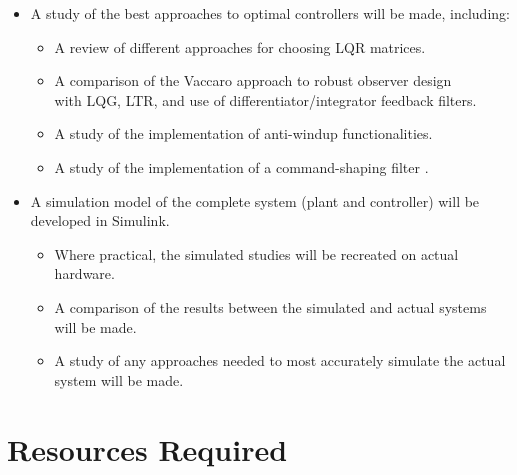 \documentclass[crop=false,float=true,class=scrartcl]{standalone}
\begin{document}
\begin{itemize}
\item A study of the best approaches to optimal controllers will be made, including:

  \begin{itemize}
  \item A review of different approaches for choosing LQR matrices.
  \item A comparison of the Vaccaro approach to robust observer design \cite{REF:Conference:2014-Vaccaro} \\
        with LQG, LTR, and use of differentiator/integrator feedback filters.
  \item A study of the implementation of anti-windup functionalities.
  \item A study of the implementation of a command-shaping filter \cite{REF:Interview:2017-01-23-Vaccaro}.
  \end{itemize}

\item A simulation model of the complete system (plant and controller) will be developed in Simulink.

  \begin{itemize}
  \item Where practical, the simulated studies will be recreated on actual hardware.
  \item A comparison of the results between the simulated and actual systems will be made.
  \item A study of any approaches needed to most accurately simulate the actual system will be made.
  \end{itemize}



\end{itemize}




\clearpage




\section{Resources Required}
\end{document}

